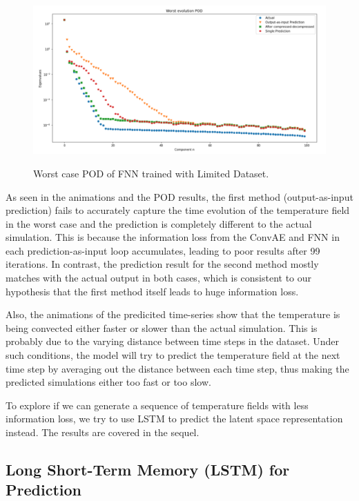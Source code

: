 \begin{figure}[H]
    \caption{Worst case POD of FNN trained with Limited Dataset.}
    \includegraphics[scale=0.5]{figures/mantle_convection_images/limited_dataset/FNN_Worst_POD.png}
    \label{figure:FNN_limited_worst_POD}
\end{figure}

As seen in the animations and the POD results, the first method (output-as-input prediction) fails to accurately capture the time evolution of the temperature field in the worst case and the prediction is completely different to the actual simulation. This is because the information loss from the ConvAE and FNN in each prediction-as-input loop accumulates, leading to poor results after 99 iterations. In contrast, the prediction result for the second method mostly matches with the actual output in both cases, which is consistent to our hypothesis that the first method itself leads to huge information loss.

Also, the animations of the predicited time-series show that the temperature is being convected either faster or slower than the actual simulation. This is probably due to the varying distance between time steps in the dataset. Under such conditions, the model will try to predict the temperature field at the next time step by averaging out the distance between each time step, thus making the predicted simulations either too fast or too slow.

To explore if we can generate a sequence of temperature fields with less information loss, we try to use LSTM to predict the latent space representation instead. The results are covered in the sequel.


\subsection{Long Short-Term Memory (LSTM) for Prediction}

